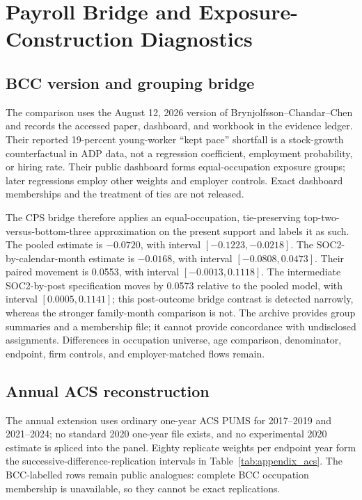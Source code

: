\section{Payroll Bridge and Exposure-Construction Diagnostics}\label{app:bcc_architecture}

\subsection{BCC version and grouping bridge}

The comparison uses the August 12, 2026 version of Brynjolfsson--Chandar--Chen and records the accessed paper, dashboard, and workbook in the evidence ledger.  Their reported 19-percent young-worker ``kept pace'' shortfall is a stock-growth counterfactual in ADP data, not a regression coefficient, employment probability, or hiring rate.  Their public dashboard forms equal-occupation exposure groups; later regressions employ other weights and employer controls.  Exact dashboard memberships and the treatment of ties are not released.

The CPS bridge therefore applies an equal-occupation, tie-preserving top-two-versus-bottom-three approximation on the present support and labels it as such.  The pooled estimate is $-0.0720$, with interval $[-0.1223,-0.0218]$.  The SOC2-by-calendar-month estimate is $-0.0168$, with interval $[-0.0808,0.0473]$.  Their paired movement is 0.0553, with interval $[-0.0013,0.1118]$.  The intermediate SOC2-by-post specification moves by 0.0573 relative to the pooled model, with interval $[0.0005,0.1141]$; this post-outcome bridge contrast is detected narrowly, whereas the stronger family-month comparison is not.  The archive provides group summaries and a membership file; it cannot provide concordance with undisclosed assignments.  Differences in occupation universe, age comparison, denominator, endpoint, firm controls, and employer-matched flows remain.



\subsection{Annual ACS reconstruction}

The annual extension uses ordinary one-year ACS PUMS for 2017--2019 and
2021--2024; no standard 2020 one-year file exists, and no experimental 2020
estimate is spliced into the panel.  Eighty replicate weights per endpoint year
form the successive-difference-replication intervals in
Table~\ref{tab:appendix_acs}.  The BCC-labelled rows remain public analogues:
complete BCC occupation membership is unavailable, so they cannot be exact
replications.

